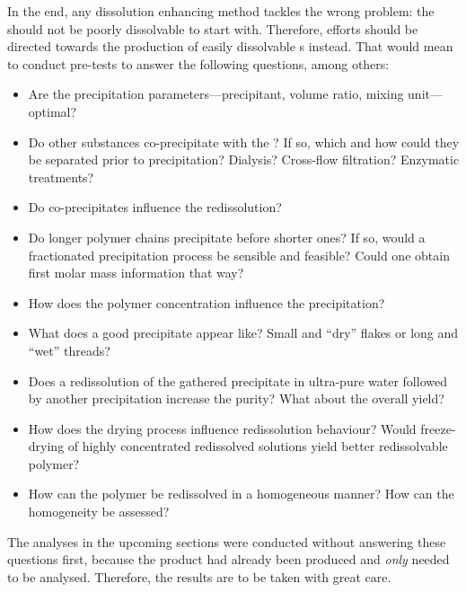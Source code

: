 In the end, any dissolution enhancing method tackles the wrong problem: the \eps{} should not be poorly dissolvable to start with. Therefore, efforts should be directed towards the production of easily dissolvable \eps{}s instead. That would mean to conduct pre-tests to answer the following questions, among others:
\begin{itemize}
	\item Are the precipitation parameters---precipitant, volume ratio, mixing unit---optimal?
	\item Do other substances co-precipitate with the \eps{}? If so, which and how could they be separated prior to precipitation? Dialysis? Cross-flow filtration? Enzymatic treatments?
	\item Do co-precipitates influence the redissolution?
	\item Do longer polymer chains precipitate before shorter ones? If so, would a fractionated precipitation process be sensible and feasible? Could one obtain first molar mass information that way?
	\item How does the polymer concentration influence the precipitation?
	\item What does a good precipitate appear like? Small and \enquote{dry} flakes or long and \enquote{wet} threads?
	\item Does a redissolution of the gathered precipitate in ultra-pure water followed by another precipitation increase the purity? What about the overall yield?
	\item How does the drying process influence redissolution behaviour? Would freeze-drying of highly concentrated redissolved solutions yield better redissolvable polymer?
	\item How can the polymer be redissolved in a homogeneous manner? How can the homogeneity be assessed?
\end{itemize}

The analyses in the upcoming sections were conducted without answering these questions first, because the product had already been produced and \textit{only} needed to be analysed. Therefore, the results are to be taken with great care.

